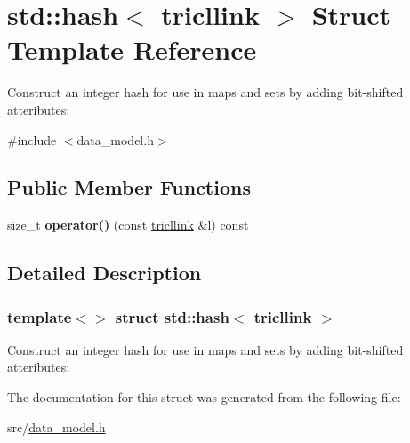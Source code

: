 \hypertarget{structstd_1_1hash_3_01tricllink_01_4}{}\section{std\+:\+:hash$<$ tricllink $>$ Struct Template Reference}
\label{structstd_1_1hash_3_01tricllink_01_4}


Construct an integer hash for use in maps and sets by adding bit-\/shifted atteributes\+:  




{\ttfamily \#include $<$data\+\_\+model.\+h$>$}

\subsection*{Public Member Functions}
\begin{DoxyCompactItemize}
\item 
\mbox{\label{structstd_1_1hash_3_01tricllink_01_4_af4693b6dbaf30377924edb5402ab7195}} 
size\+\_\+t {\bfseries operator()} (const \hyperlink{structtricl_1_1tricllink}{tricllink} \&l) const
\end{DoxyCompactItemize}


\subsection{Detailed Description}
\subsubsection*{template$<$$>$\newline
struct std\+::hash$<$ tricllink $>$}

Construct an integer hash for use in maps and sets by adding bit-\/shifted atteributes\+: 

The documentation for this struct was generated from the following file\+:\begin{DoxyCompactItemize}
\item 
src/\hyperlink{data__model_8h}{data\+\_\+model.\+h}\end{DoxyCompactItemize}
